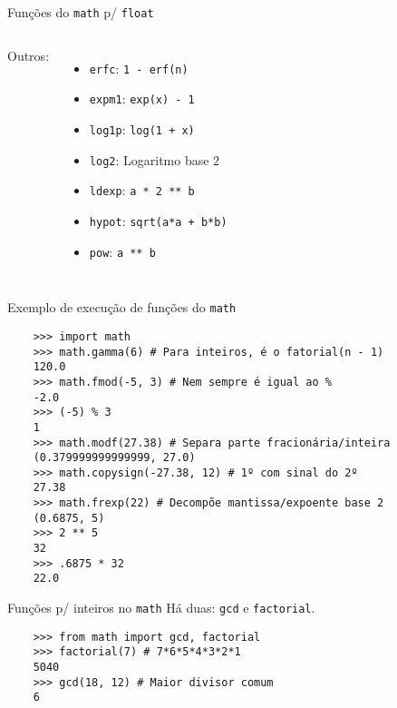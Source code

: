 \documentclass[utf8]{beamer}
\begin{document}
\begin{frame}{Funções do \texttt{math} p/ \texttt{float}}
\begin{columns}
    Outros:
    \begin{itemize}
      \item \texttt{erfc}: \texttt{1 - erf(n)}
      \item \texttt{expm1}: \texttt{exp(x) - 1}
      \item \texttt{log1p}: \texttt{log(1 + x)}
      \item \texttt{log2}: Logaritmo base $2$
      \item \texttt{ldexp}: \texttt{a * 2 ** b}
      \item \texttt{hypot}:
              \texttt{sqrt(a*a + b*b)}
      \item \texttt{pow}: \texttt{a ** b}
    \end{itemize}

  \end{columns}
\end{frame}


\begin{frame}[fragile]{Exemplo de execução de funções do \texttt{math}}
  \begin{verbatim}
    >>> import math
    >>> math.gamma(6) # Para inteiros, é o fatorial(n - 1)
    120.0
    >>> math.fmod(-5, 3) # Nem sempre é igual ao %
    -2.0
    >>> (-5) % 3
    1
    >>> math.modf(27.38) # Separa parte fracionária/inteira
    (0.379999999999999, 27.0)
    >>> math.copysign(-27.38, 12) # 1º com sinal do 2º
    27.38
    >>> math.frexp(22) # Decompõe mantissa/expoente base 2
    (0.6875, 5)
    >>> 2 ** 5
    32
    >>> .6875 * 32
    22.0
  \end{verbatim}
\end{frame}


\begin{frame}[fragile]{Funções p/ inteiros no \texttt{math}}
  Há duas: \texttt{gcd} e \texttt{factorial}.

  \begin{verbatim}
    >>> from math import gcd, factorial
    >>> factorial(7) # 7*6*5*4*3*2*1
    5040
    >>> gcd(18, 12) # Maior divisor comum
    6
  \end{verbatim}
\end{frame}
\end{document}
